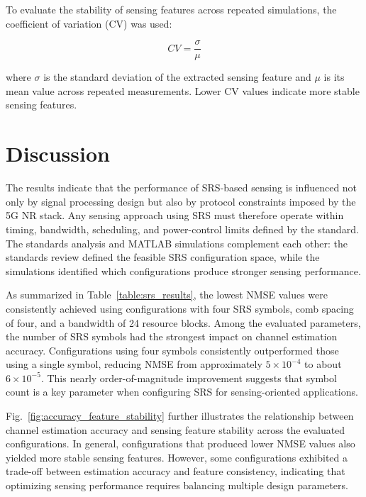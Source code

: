 \documentclass[conference]{IEEEtran}
\begin{document}
To evaluate the stability of sensing features across repeated simulations, the coefficient of variation (CV) was used:

\begin{equation}
CV = \frac{\sigma}{\mu}
\end{equation}

where $\sigma$ is the standard deviation of the extracted sensing feature and $\mu$ is its mean value across repeated measurements. Lower CV values indicate more stable sensing features.

\section{Discussion}

The results indicate that the performance of SRS-based sensing is influenced not only by signal processing design but also by protocol constraints imposed by the 5G NR stack. Any sensing approach using SRS must therefore operate within timing, bandwidth, scheduling, and power-control limits defined by the standard. The standards analysis and MATLAB simulations complement each other: the standards review defined the feasible SRS configuration space, while the simulations identified which configurations produce stronger sensing performance.

As summarized in Table~\ref{table:srs_results}, the lowest NMSE values were consistently achieved using configurations with four SRS symbols, comb spacing of four, and a bandwidth of 24 resource blocks. Among the evaluated parameters, the number of SRS symbols had the strongest impact on channel estimation accuracy. Configurations using four symbols consistently outperformed those using a single symbol, reducing NMSE from approximately $5 \times 10^{-4}$ to about $6 \times 10^{-5}$. This nearly order-of-magnitude improvement suggests that symbol count is a key parameter when configuring SRS for sensing-oriented applications.

Fig.~\ref{fig:accuracy_feature_stability} further illustrates the relationship between channel estimation accuracy and sensing feature stability across the evaluated configurations. In general, configurations that produced lower NMSE values also yielded more stable sensing features. However, some configurations exhibited a trade-off between estimation accuracy and feature consistency, indicating that optimizing sensing performance requires balancing multiple design parameters.
\end{document}
